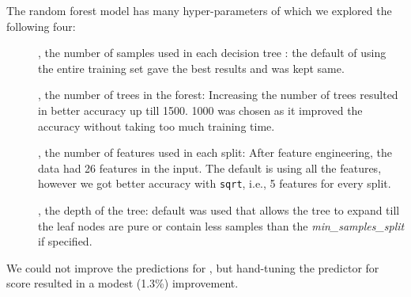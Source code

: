 The random forest model has many hyper-parameters of which we explored the following four:
\begin{description}
    \item[], the number of samples used in each decision tree : the default of using the entire training set gave the best results and was kept same.
    \item[], the number of trees in the forest: Increasing the number of trees resulted in better accuracy up till 1500. 1000 was chosen as it improved the accuracy without taking too much training time.
    \item[], the number of features used in each split: After feature engineering, the data had 26 features in the input. The default is using all the features, however we got better accuracy with \texttt{sqrt}, i.e., 5 features for every split.
    \item[], the depth of the tree: default was used that allows the tree to expand till the leaf nodes are pure or contain less samples than the \textit{min\_samples\_split} if specified.
\end{description}

We could not improve the predictions for , but hand-tuning the predictor for  score resulted in a modest (1.3\%) improvement.



